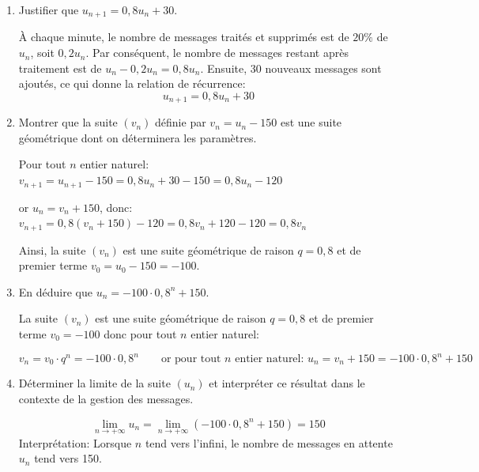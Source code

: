\documentclass[11pt, a4paper]{report}
\begin{document}
\begin{enumerate}[resume]
    \item Justifier que $u_{n+1} = 0,8 u_n + 30$.
    \begin{blocvisiblex}[height=3]
        {\quad}

        À chaque minute, le nombre de messages traités et supprimés est de $20\%$ de $u_n$, soit $0,2 u_n$. Par conséquent, le nombre de messages restant après traitement est de $u_n - 0,2 u_n = 0,8 u_n$. Ensuite, 30 nouveaux messages sont ajoutés, ce qui donne la relation de récurrence: 
\[u_{n+1} = 0,8 u_n + 30\]
    \end{blocvisiblex}

    \medskip

    \item Montrer que la suite $(v_{n})$ définie par $v_n = u_n - 150$ est une suite géométrique dont on déterminera les paramètres.
    \begin{blocvisiblex}[height=4]
        {\quad}

        Pour tout $n$ entier naturel:  $v_{n+1} = u_{n+1} - 150 = 0,8 u_n + 30 - 150 = 0,8 u_n - 120$

        or $u_n = v_n + 150$, donc: $v_{n+1} = 0,8 (v_n + 150) - 120 = 0,8 v_n + 120 - 120 = 0,8 v_n$
        
        Ainsi, la suite $(v_n)$ est une suite géométrique de raison $q=0,8$ et de premier terme $v_0 = u_0 - 150 = -100$.
    \end{blocvisiblex}

    \medskip

    \item En déduire que $u_n = -100 \cdot 0,8^n + 150$.    
    \begin{blocvisiblex}[height=2.5]
        {\quad}

        La suite $(v_n)$ est une suite géométrique de raison $q=0,8$ et de premier terme $v_0 = -100$ donc pour tout $n$ entier naturel:

        \[v_n = v_0 \cdot q^n = -100 \cdot 0,8^n \qquad \text{or pour tout $n$ entier naturel: $u_n = v_n + 150 = -100 \cdot 0,8^n + 150$}\]
    \end{blocvisiblex}

    \medskip

    \item Déterminer la limite de la suite $(u_n)$ et interpréter ce résultat dans le contexte de la gestion des messages.
    \begin{blocvisiblex}[height=2]
        {\quad}
        \[\lim_{n \to +\infty} u_n = \lim_{n \to +\infty} (-100 \cdot 0,8^n + 150) = 150\]
        Interprétation: Lorsque $n$ tend vers l'infini, le nombre de messages en attente $u_n$ tend vers 150. 
    \end{blocvisiblex}



\end{enumerate}
\end{document}
